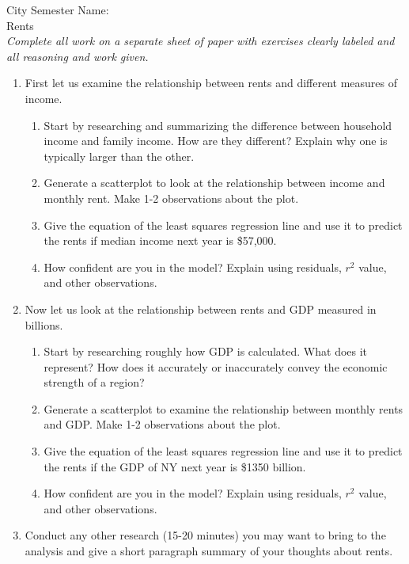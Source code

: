 \documentclass[12pt]{article}
\theoremstyle{plain}     %
\begin{document}
\large
City Semester  \hspace{7cm} Name:\makebox[6cm]{\hrulefill}
\\
Rents\\
\normalsize 
\emph{Complete all work on a separate sheet of paper with exercises clearly labeled and all reasoning and work given.}\\[.5cm]
\begin{enumerate}
	\item First let us examine the relationship between rents and different measures of income.
		\begin{enumerate}
			\item Start by researching and summarizing the difference between household income and family income. How are they different? Explain why one is typically larger than the other.
			\item Generate a scatterplot to look at the relationship between income and monthly rent. Make 1-2 observations about the plot.
			\item Give the equation of the least squares regression line and use it to predict the rents if median income next year is \$57,000.
			\item How confident are you in the model? Explain using residuals, $r^2$ value, and other observations.
		\end{enumerate}
	\item Now let us look at the relationship between rents and GDP measured in billions.
		\begin{enumerate}
			\item Start by researching roughly how GDP is calculated. What does it represent? How does it accurately or inaccurately convey the economic strength of a region?
			\item Generate a scatterplot to examine the relationship between monthly rents and GDP. Make 1-2 observations about the plot.
			\item Give the equation of the least squares regression line and use it to predict the rents if the GDP of NY next year is \$1350 billion.
			\item How confident are you in the model? Explain using residuals, $r^2$ value, and other observations.
		\end{enumerate}
	\item Conduct any other research (15-20 minutes) you may want to bring to the analysis and give a short paragraph summary of your thoughts about rents.
\end{enumerate}
	
\end{document}

